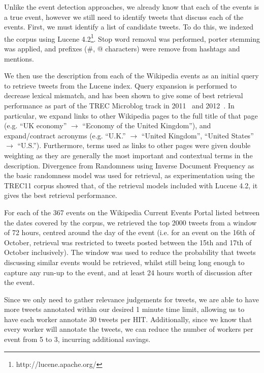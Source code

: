 Unlike the event detection approaches, we already know that each of the events is a true event, however we still need to identify tweets that discuss each of the events.
First, we must identify a list of candidate tweets.
To do this, we indexed the corpus using Lucene 4.2\footnote{http://lucene.apache.org/}.
Stop word removal was performed, porter stemming was applied, and prefixes (\#, @ characters) were remove from hashtags and mentions.

We then use the description from each of the Wikipedia events as an initial query to retrieve tweets from the Lucene index.
Query expansion is performed to decrease lexical mismatch, and has been shown to give some of best retrieval performance as part of the TREC Microblog track in 2011~\citep{gambosi2011fub,ferguson2011clarity,li2011pris} and 2012~\citep{kimovercoming,younosFreq,hanhit}.
In particular, we expand links to other Wikipedia pages to the full title of that page (e.g. ``UK economy'' \(\to\) ``Economy of the United Kingdom''), and expand/contract acronyms (e.g. ``U.K.'' \(\to\) ``United Kingdom'', ``United States'' \(\to\) ``U.S.'').
Furthermore, terms used as links to other pages were given double weighting as they are generally the most important and contextual terms in the description.
Divergence from Randomness using Inverse Document Frequency as the basic randomness model was used for retrieval, as experimentation using the TREC11 corpus showed that, of the retrieval models included with Lucene 4.2, it gives the best retrieval performance.

For each of the 367 events on the Wikipedia Current Events Portal listed between the dates covered by the corpus, we retrieved the top 2000 tweets from a window of 72 hours, centred around the day of the event (i.e. for an event on the 16th of October, retrieval was restricted to tweets posted between the 15th and 17th of October inclusively).
The window was used to reduce the probability that tweets discussing similar events would be retrieved, whilst still being long enough to capture any run-up to the event, and at least 24 hours worth of discussion after the event.

Since we only need to gather relevance judgements for tweets, we are able to have more tweets annotated within our desired 1 minute time limit, allowing us to have each worker annotate 30 tweets per HIT.
Additionally, since we know that every worker will annotate the tweets, we can reduce the number of workers per event from 5 to 3, incurring additional savings.

